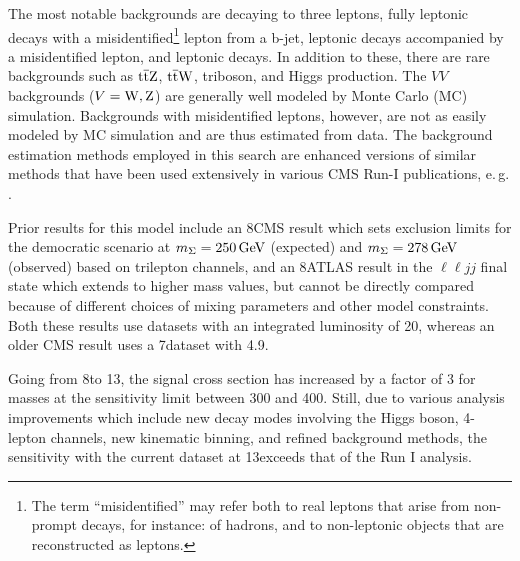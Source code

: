 The most notable backgrounds are \WZ decaying to three leptons, fully leptonic \ttbar decays with a misidentified\footnote{The term ``misidentified'' may refer both to real leptons that arise from non-prompt decays, for instance: of hadrons, and to non-leptonic objects that are reconstructed as leptons.} lepton from a b-jet, leptonic \Z decays accompanied by a misidentified lepton, and leptonic \ZZ decays. In addition to these, there are rare backgrounds such as $\mathrm{t}\overline{\mathrm{t}}\mathrm{Z}$, $\mathrm{t}\overline{\mathrm{t}}\mathrm{W}$, triboson, and Higgs production.
The $VV$ backgrounds ($V = \mathrm{W}, \mathrm{Z}$) are generally well modeled by Monte Carlo (MC) simulation. Backgrounds with misidentified leptons, however, are not as easily modeled by MC simulation and are thus estimated from data. The background estimation methods employed in this search are enhanced versions of similar methods that have been used extensively in various CMS Run-I publications, e.\,g. \cite{Chatrchyan:2013xsw,Chatrchyan:2014aea,Khachatryan:2014mma,Khachatryan:2014jya}.

Prior results for this model include an 8\TeV CMS result \cite{CMS-PAS-EXO-14-001} which sets exclusion limits for the democratic scenario at $m_\Sigma = 250\,\text{Ge\hspace{-.08em}V}$ (expected) and $m_\Sigma = 278\,\text{Ge\hspace{-.08em}V}$ (observed) based on trilepton channels, and an 8\TeV ATLAS result in the $\ell\ell jj$ final state \cite{ATLAS-CERN-PH-EP-2015-094} which extends to higher mass values, but cannot be directly compared because of different choices of mixing parameters and other model constraints. Both these results use datasets with an integrated luminosity of 20\fbinv, whereas an older CMS result uses a 7\TeV dataset with 4.9\fbinv \cite{CMS-PAPER-EXO-11-073}.

Going from 8\TeV to 13\TeV, the signal cross section has increased by a factor of 3 for masses at the sensitivity limit between 300 and 400\GeV. Still, due to various analysis improvements which include new decay modes involving the Higgs boson, 4-lepton channels, new kinematic binning, and refined background methods, the sensitivity with the current \fullLumi dataset at 13\TeV exceeds that of the Run I analysis.


